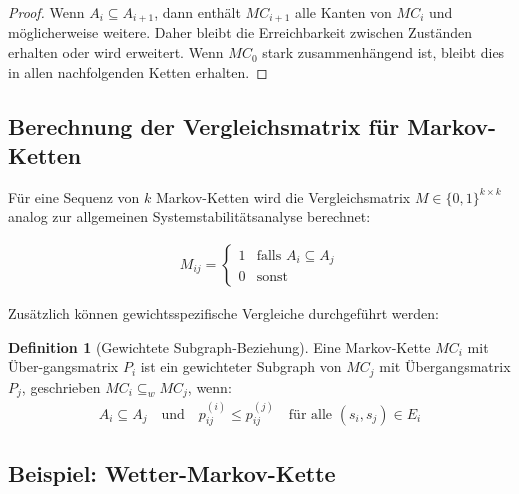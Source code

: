 \documentclass[a4paper,12pt]{article}
\theoremstyle{definition}
\newtheorem{definition}{Definition}
\begin{document}
\begin{proof}
	Wenn $A_i \subseteq A_{i+1}$, dann enthält $MC_{i+1}$ alle Kanten von $MC_i$ und möglicherweise weitere. Daher bleibt die Erreichbarkeit zwischen Zuständen erhalten oder wird erweitert. Wenn $MC_0$ stark zusammenhängend ist, bleibt dies in allen nachfolgenden Ketten erhalten.
\end{proof}

\subsection{Berechnung der Vergleichsmatrix für Markov-Ketten}

Für eine Sequenz von $k$ Markov-Ketten wird die Vergleichsmatrix $M \in \{0,1\}^{k \times k}$ analog zur allgemeinen Systemstabilitätsanalyse berechnet:

\begin{align}
	M_{ij} = \begin{cases}
		1 & \text{falls } A_i \subseteq A_j \\
		0 & \text{sonst}
	\end{cases}
\end{align}

Zusätzlich können gewichtsspezifische Vergleiche durchgeführt werden:

\begin{definition}[Gewichtete Subgraph-Beziehung]
	Eine Markov-Kette $MC_i$ mit Über-gangsmatrix $P_i$ ist ein gewichteter Subgraph von $MC_j$ mit Übergangsmatrix $P_j$, geschrieben $MC_i \subseteq_w MC_j$, wenn:
	\begin{align}
		A_i \subseteq A_j \quad \text{und} \quad p_{ij}^{(i)} \leq p_{ij}^{(j)} \quad \text{für alle } (s_i, s_j) \in E_i
	\end{align}
\end{definition}

\subsection{Beispiel: Wetter-Markov-Kette}
\end{document}
